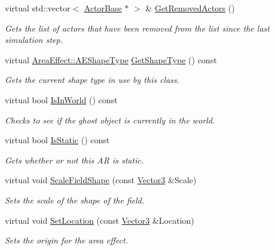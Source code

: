 \begin{DoxyCompactItemize}
virtual std::vector$<$ \hyperlink{classphys_1_1ActorBase}{ActorBase} $\ast$ $>$ \& \hyperlink{classphys_1_1AreaEffect_a021763db69e977a3a19ad7cc39df073b}{GetRemovedActors} ()
\begin{DoxyCompactList}\small\item\em Gets the list of actors that have been removed from the list since the last simulation step. \item\end{DoxyCompactList}\item 
virtual \hyperlink{classphys_1_1AreaEffect_a99b8746c43eac266d48ad613110dc6f9}{AreaEffect::AEShapeType} \hyperlink{classphys_1_1AreaEffect_a994162616c167a878dd5c0eff372bc06}{GetShapeType} () const 
\begin{DoxyCompactList}\small\item\em Gets the current shape type in use by this class. \item\end{DoxyCompactList}\item 
virtual bool \hyperlink{classphys_1_1AreaEffect_a2ef4bb9389dd9296e680a77058609712}{IsInWorld} () const 
\begin{DoxyCompactList}\small\item\em Checks to see if the ghost object is currently in the world. \item\end{DoxyCompactList}\item 
virtual bool \hyperlink{classphys_1_1AreaEffect_aecdf8cb72c6182e2495cf25c01afc249}{IsStatic} () const 
\begin{DoxyCompactList}\small\item\em Gets whether or not this AR is static. \item\end{DoxyCompactList}\item 
virtual void \hyperlink{classphys_1_1AreaEffect_a140c51a8761f487e1c8f4e7123bb0b31}{ScaleFieldShape} (const \hyperlink{classphys_1_1Vector3}{Vector3} \&Scale)
\begin{DoxyCompactList}\small\item\em Sets the scale of the shape of the field. \item\end{DoxyCompactList}\item 
virtual void \hyperlink{classphys_1_1AreaEffect_a6d1499c36db3bbb5341ee3aa2e90b52f}{SetLocation} (const \hyperlink{classphys_1_1Vector3}{Vector3} \&Location)
\begin{DoxyCompactList}\small\item\em Sets the origin for the area effect. \item\end{DoxyCompactList}\item 

\end{DoxyCompactItemize}
